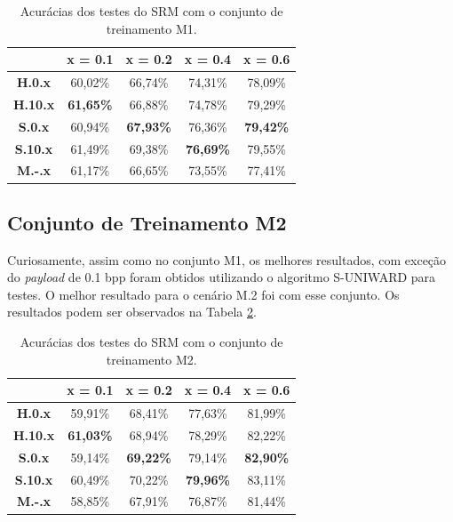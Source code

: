 \begin{table}[!htb] 
\centering
\begin{tabular}{c|c|c|c|c|}
\cline{2-5}
\textbf{}                             & \textbf{x = 0.1} & \textbf{x = 0.2} & \textbf{x = 0.4} & \textbf{x = 0.6} \\ \hline
\multicolumn{1}{|c|}{\textbf{H.0.x}}  & 60,02\%          & 66,74\%          & 74,31\%          & 78,09\%          \\ \hline
\multicolumn{1}{|c|}{\textbf{H.10.x}} & \textbf{61,65\%} & 66,88\% & 74,78\% & 79,29\% \\ \hline
\multicolumn{1}{|c|}{\textbf{S.0.x}}  & 60,94\%          & \textbf{67,93\%}          & 76,36\%          & \textbf{79,42\%}          \\ \hline
\multicolumn{1}{|c|}{\textbf{S.10.x}} & 61,49\%          & 69,38\%        & \textbf{76,69\%}          & 79,55\%          \\ \hline
\multicolumn{1}{|c|}{\textbf{M.-.x}}  & 61,17\%          & 66,65\%          & 73,55\%          & 77,41\%          \\ \hline
\end{tabular}
\caption{Acurácias dos testes do SRM com o conjunto de treinamento M1.}
\label{tab:srm_m1}

\end{table}


\subsection{Conjunto de Treinamento M2}

Curiosamente, assim como no conjunto M1, os melhores resultados, com exceção do \textit{payload} de 0.1 bpp foram obtidos utilizando o algoritmo S-UNIWARD para testes. O melhor resultado para o cenário M.2 foi com esse conjunto.
Os resultados podem ser observados na Tabela \ref{tab:srm_m2}.

\begin{table}[!htb]
\centering
\begin{tabular}{c|c|c|c|c|}
\cline{2-5}
\textbf{}                             & \textbf{x = 0.1} & \textbf{x = 0.2} & \textbf{x = 0.4} & \textbf{x = 0.6} \\ \hline
\multicolumn{1}{|c|}{\textbf{H.0.x}}  & 59,91\%          & 68,41\%          & 77,63\%          & 81,99\%          \\ \hline
\multicolumn{1}{|c|}{\textbf{H.10.x}} & \textbf{61,03\%} & 68,94\% & 78,29\% & 82,22\% \\ \hline
\multicolumn{1}{|c|}{\textbf{S.0.x}}  & 59,14\%          & \textbf{69,22\%}          & 79,14\%          & \textbf{82,90\%}          \\ \hline
\multicolumn{1}{|c|}{\textbf{S.10.x}} & 60,49\%          & 70,22\%          & \textbf{79,96\%}          & 83,11\%          \\ \hline
\multicolumn{1}{|c|}{\textbf{M.-.x}}  & 58,85\%          & 67,91\%          & 76,87\%          & 81,44\%          \\ \hline
\end{tabular}
\caption{Acurácias dos testes do SRM com o conjunto de treinamento M2.}
\label{tab:srm_m2}
\end{table}

